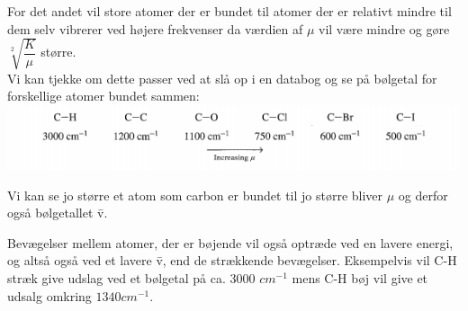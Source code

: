 For det andet vil store atomer der er bundet til atomer der er relativt mindre til dem selv vibrerer ved højere frekvenser da værdien af $\mu$ vil være mindre og gøre $\sqrt[2]{\dfrac{K}{\mu}}$ større. 
\\

Vi kan tjekke om dette passer ved at slå op i en databog og se på bølgetal for forskellige atomer bundet sammen:
\\
\includegraphics[scale=1]{Billeder/udklip}

Vi kan se jo større et atom som carbon er bundet til jo større bliver $\mu$ og derfor også bølgetallet \={v}.

Bevægelser mellem atomer, der er bøjende vil også optræde ved en lavere energi, og altså også ved et lavere \={v}, end de strækkende bevægelser. Eksempelvis vil C-H stræk give udslag ved et bølgetal på ca. 3000 $cm^{-1}$ mens C-H bøj vil give et udsalg omkring $1340cm^{-1}$.
